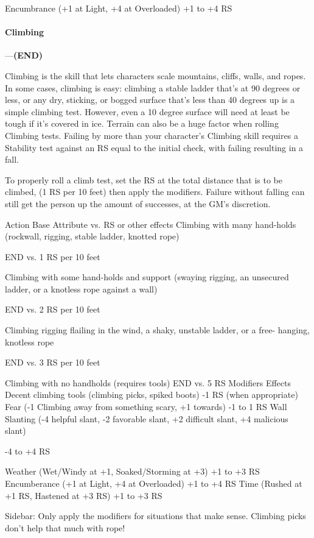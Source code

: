 \documentclass[oneside,11pt,english]{book}
\begin{document}
Encumbrance (+1 at Light, +4 at Overloaded) +1 to +4 RS 
\paragraph{\label{skill:Climbing}Climbing}---\quad\textbf{(END) }\par
Climbing is the skill that lets characters scale mountains, cliffs, walls, and ropes. In some cases, climbing is easy: climbing a stable ladder that’s at 90 degrees or less, or any dry, sticking, or bogged surface that’s less than 40 degrees up is a simple climbing test. However, even a 10 degree surface will need at least be tough if it’s covered in ice. Terrain can also be a huge factor when rolling Climbing tests. Failing by more than your character’s Climbing skill requires a Stability test against an RS equal to the initial check, with failing resulting in a fall.


To properly roll a climb test, set the RS at the total distance that is to be climbed, (1 RS per 10 feet) then apply the modifiers. Failure without falling can still get the person up the amount of successes, at the GM’s discretion.


Action Base Attribute vs. RS or 
other effects 
Climbing with many hand-holds (rockwall, rigging, stable ladder, knotted 
rope) 

END vs. 1 RS per 10 feet 

Climbing with some hand-holds and support (swaying rigging, an 
unsecured ladder, or a knotless rope against a wall) 

END vs. 2 RS per 10 feet 

Climbing rigging flailing in the wind, a shaky, unstable ladder, or a free-
hanging, knotless rope 

END vs. 3 RS per 10 feet 

Climbing with no handholds (requires tools) END vs. 5 RS 
Modifiers Effects 
Decent climbing tools (climbing picks, spiked boots) -1 RS (when appropriate) 
Fear (-1 Climbing away from something scary, +1 towards) -1 to 1 RS 
Wall Slanting (-4 helpful slant, -2 favorable slant, +2 difficult slant, +4 
malicious slant) 

-4 to +4 RS 

Weather (Wet/Windy at +1, Soaked/Storming at +3) +1 to +3 RS 
Encumberance (+1 at Light, +4 at Overloaded) +1 to +4 RS 
Time (Rushed at +1 RS, Hastened at +3 RS) +1 to +3 RS 


 
Sidebar: 
Only apply the modifiers for situations that make sense. Climbing picks don’t help that much with rope! 
\end{document}
